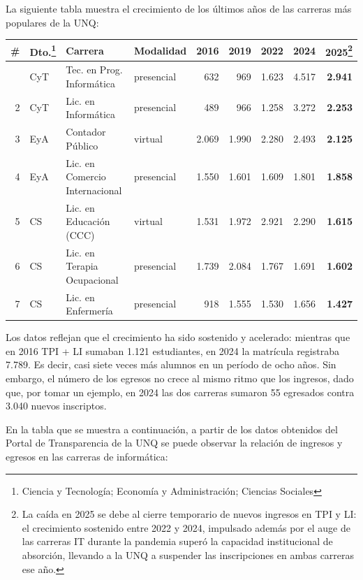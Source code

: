 \documentclass[
  spanish,
]{article}
\newcounter{none} %
\begin{document}
\pagebreak

La siguiente tabla muestra el crecimiento de los últimos años de las carreras más populares de la UNQ:

{\def\LTcaptype{none} %
\begin{longtable}[]{@{}rlp{4.8cm}lrrrrr@{}}
\toprule\noalign{}
\# & Dto.\footnote{Ciencia y Tecnología; Economía y Administración; Ciencias Sociales} & Carrera & Modalidad  & 2016 & 2019 & 2022 & 2024 & \textbf{2025}\footnote{La caída en 2025 se debe al cierre temporario de nuevos ingresos en TPI y LI: el crecimiento sostenido entre 2022 y 2024, impulsado además por el auge de las carreras IT durante la pandemia superó la capacidad institucional de absorción, llevando a la UNQ a suspender las inscripciones en ambas carreras ese año.} \\
\midrule\noalign{}
\endhead
\bottomrule\noalign{}
\endlastfoot
1 & CyT & Tec. en Prog. Informática      & presencial &   632 &   969 & 1.623 & 4.517 & \textbf{2.941} \\
2 & CyT & Lic. en Informática            & presencial &   489 &   966 & 1.258 & 3.272 & \textbf{2.253} \\
3 & EyA & Contador Público               & virtual    & 2.069 & 1.990 & 2.280 & 2.493 & \textbf{2.125} \\
4 & EyA & Lic. en Comercio Internacional & presencial & 1.550 & 1.601 & 1.609 & 1.801 & \textbf{1.858} \\
5 & CS  & Lic. en Educación (CCC)        & virtual    & 1.531 & 1.972 & 2.921 & 2.290 & \textbf{1.615} \\
6 & CS  & Lic. en Terapia Ocupacional    & presencial & 1.739 & 2.084 & 1.767 & 1.691 & \textbf{1.602} \\
7 & CS  & Lic. en Enfermería             & presencial &   918 & 1.555 & 1.530 & 1.656 & \textbf{1.427} \\
\end{longtable}
}


Los datos reflejan que el crecimiento ha sido sostenido y acelerado: mientras que en 2016 TPI + LI
sumaban 1.121 estudiantes, en 2024 la matrícula registraba 7.789. Es decir,
casi siete veces más alumnos en un período de ocho años.
Sin embargo, el número de los egresos no crece al mismo ritmo que los ingresos,
dado que, por tomar un ejemplo, en 2024 las dos carreras sumaron 55 egresados contra 3.040 nuevos inscriptos.

En la tabla que se muestra a continuación, a partir de los datos obtenidos
del Portal de Transparencia de la UNQ \citep{unq2025transparencia}
se puede observar la relación de ingresos y egresos en las carreras de informática:
\end{document}
